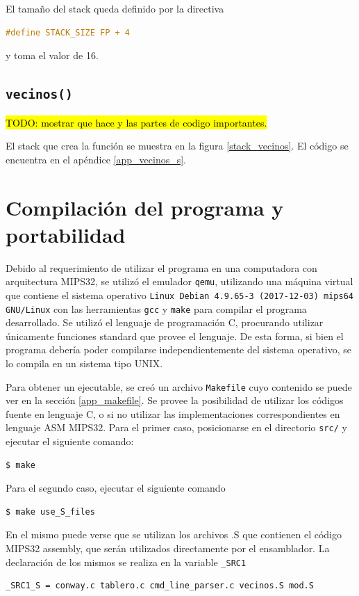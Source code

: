 El tamaño del stack queda definido por la directiva
\begin{lstlisting}[language=C, style=StyleC]
#define STACK_SIZE FP + 4
\end{lstlisting}
y toma el valor de \SI{16}{}.

\subsection{\texttt{vecinos()}}

\hl{TODO: mostrar que hace y las partes de codigo importantes.}

El stack que crea la función se muestra en la figura \ref{stack_vecinos}. El código se encuentra en el apéndice \ref{app_vecinos_s}.

\section{Compilación del programa y portabilidad}

Debido al requerimiento de utilizar el programa en una computadora con arquitectura MIPS32, se utilizó el emulador \texttt{qemu}, utilizando una máquina virtual que contiene el sistema operativo \texttt{Linux Debian 4.9.65-3 (2017-12-03) mips64 GNU/Linux} con las herramientas \texttt{gcc} y \texttt{make} para compilar el programa desarrollado. Se utilizó el lenguaje de programación C, procurando utilizar únicamente funciones standard que provee el lenguaje. De esta forma, si bien el programa debería poder compilarse independientemente del sistema operativo, se lo compila en un sistema tipo UNIX.

Para obtener un ejecutable, se creó un archivo \texttt{Makefile} cuyo contenido se puede ver en la sección \ref{app_makefile}. Se provee la posibilidad de utilizar los códigos fuente en lenguaje C, o si no utilizar las implementaciones correspondientes en lenguaje ASM MIPS32. Para el primer caso, posicionarse en el directorio \texttt{src/} y ejecutar el siguiente comando:
\begin{lstlisting}[language=bash, style=StyleC]
$ make 
\end{lstlisting}
Para el segundo caso, ejecutar el siguiente comando
\begin{lstlisting}[language=bash, style=StyleC]
$ make use_S_files
\end{lstlisting}

En el mismo puede verse que se utilizan los archivos .S que contienen el código MIPS32 assembly, que serán utilizados directamente por el ensamblador. La declaración de los mismos se realiza en la variable \texttt{\_SRC1}
\begin{lstlisting}[language=bash, style=StyleC]
_SRC1_S = conway.c tablero.c cmd_line_parser.c vecinos.S mod.S
\end{lstlisting}

